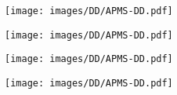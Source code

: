\begin{figure}
	\begin{center}
    		\texttt{[image: images/DD/APMS-DD.pdf]}
	\end{center}
\end{figure}
\begin{figure}
	\begin{center}
    		\texttt{[image: images/DD/APMS-DD.pdf]}
	\end{center}
\end{figure}
\begin{figure}
	\begin{center}
    		\texttt{[image: images/DD/APMS-DD.pdf]}
	\end{center}
\end{figure}
\begin{figure}
	\begin{center}
    		\texttt{[image: images/DD/APMS-DD.pdf]}
	\end{center}
\end{figure}
%